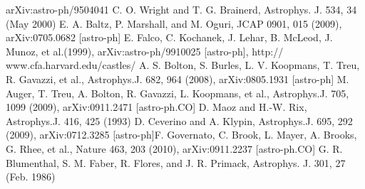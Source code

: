 \documentclass{article}
\begin{document}
\begin{multicols}{2}
\begin{thebibliography}{24}
arXiv:astro-ph/9504041
C. O. Wright and T. G. Brainerd, Astrophys. J. 534, 34
(May 2000)
E. A. Baltz, P. Marshall, and M. Oguri, JCAP 0901, 015
(2009), arXiv:0705.0682 [astro-ph]
E. Falco, C. Kochanek, J. Lehar, B. McLeod, J. Munoz,
et al.(1999), arXiv:astro-ph/9910025 [astro-ph], http://
www.cfa.harvard.edu/castles/
A. S. Bolton, S. Burles, L. V. Koopmans, T. Treu,
R. Gavazzi, et al., Astrophys.J. 682, 964 (2008),
arXiv:0805.1931 [astro-ph]
M. Auger, T. Treu, A. Bolton, R. Gavazzi, L. Koopmans,
et al., Astrophys.J. 705, 1099 (2009), arXiv:0911.2471
[astro-ph.CO]
D. Maoz and H.-W. Rix, Astrophys.J. 416, 425 (1993)
D. Ceverino and A. Klypin, Astrophys.J. 695, 292 (2009),
arXiv:0712.3285 [astro-ph]F. Governato, C. Brook,
L. Mayer, A. Brooks, G. Rhee, et al., Nature 463, 203
(2010), arXiv:0911.2237 [astro-ph.CO]
G. R. Blumenthal, S. M. Faber, R. Flores, and J. R.
Primack, Astrophys. J. 301, 27 (Feb. 1986)
\end{thebibliography}


\end{multicols}
\end{document}
